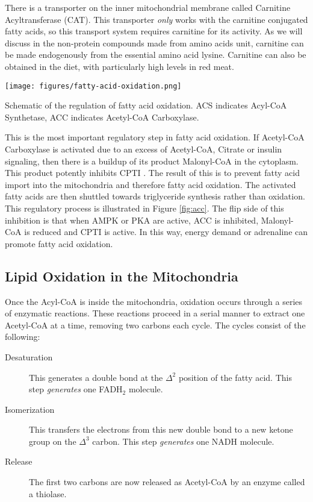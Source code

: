 \documentclass{tufte-handout}
\begin{document}
There is a transporter on the inner mitochondrial membrane called Carnitine Acyltransferase (CAT).  This transporter \emph{only} works with the carnitine conjugated fatty acids, so this transport system requires carnitine for its activity.  As we will discuss in the non-protein compounds made from amino acids unit, carnitine can be made endogenously from the essential amino acid lysine.  Carnitine can also be obtained in the diet, with particularly high levels in red meat.


\begin{marginfigure}
\texttt{[image: figures/fatty-acid-oxidation.png]}
\caption{Schematic of the regulation of fatty acid oxidation.  ACS indicates Acyl-CoA Synthetase, ACC indicates Acetyl-CoA Carboxylase.}
\label{fig:acc}
\end{marginfigure}


  This is the most important regulatory step in fatty acid oxidation.  If Acetyl-CoA Carboxylase is activated due to an excess of Acetyl-CoA, Citrate or insulin signaling, then there is a buildup of its product Malonyl-CoA in the cytoplasm.  This product potently inhibits CPTI \citep{McGarry1979}.  The result of this is to prevent fatty acid import into the mitochondria and therefore fatty acid oxidation.  The activated fatty acids are then shuttled towards triglyceride synthesis rather than oxidation.  This regulatory process is illustrated in Figure \ref{fig:acc}.  The flip side of this inhibition is that when AMPK or PKA are active, ACC is inhibited, Malonyl-CoA is reduced and CPTI is active.  In this way, energy demand or adrenaline can promote fatty acid oxidation.

\subsection{Lipid Oxidation in the Mitochondria}

Once the Acyl-CoA is inside the mitochondria, oxidation occurs through a series of enzymatic reactions.  These reactions proceed in a serial manner to extract one Acetyl-CoA at a time, removing two carbons each cycle.  The cycles consist of the following:

\begin{description}
\item [Desaturation] This generates a double bond at the $\Delta^2$ position of the fatty acid.  This step \emph{generates} one FADH$_2$ molecule.
\item [Isomerization] This transfers the electrons from this new double bond to a new ketone group on the  $\Delta^3$ carbon.  This step \emph{generates} one NADH molecule.
\item [Release] The first two carbons are now released as Acetyl-CoA by an enzyme called a thiolase.
\end{description} 
\end{document}
